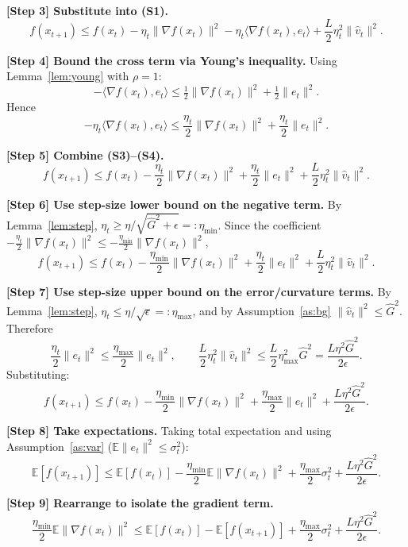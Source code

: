 \documentclass[11pt]{article}
\begin{document}
\noindent\textbf{[Step 3] Substitute into (S1).}
\[
f(x_{t+1}) \le f(x_t) - \eta_t \|\nabla f(x_t)\|^2
- \eta_t \langle \nabla f(x_t), e_t\rangle
+ \frac{L}{2}\eta_t^2 \|\hat v_t\|^2.
\tag{S3}
\]

\noindent\textbf{[Step 4] Bound the cross term via Young's inequality.}
Using Lemma~\ref{lem:young} with $\rho=1$:
\[
-\langle \nabla f(x_t), e_t\rangle
\le \tfrac12 \|\nabla f(x_t)\|^2 + \tfrac12 \|e_t\|^2.
\tag{S4}
\]
Hence
\[
-\eta_t\langle \nabla f(x_t), e_t\rangle
\le \frac{\eta_t}{2}\|\nabla f(x_t)\|^2 + \frac{\eta_t}{2}\|e_t\|^2.
\]

\noindent\textbf{[Step 5] Combine (S3)–(S4).}
\[
f(x_{t+1}) \le f(x_t) - \frac{\eta_t}{2}\|\nabla f(x_t)\|^2
+ \frac{\eta_t}{2}\|e_t\|^2
+ \frac{L}{2}\eta_t^2 \|\hat v_t\|^2.
\tag{S5}
\]

\noindent\textbf{[Step 6] Use step-size lower bound on the negative term.}
By Lemma~\ref{lem:step}, $\eta_t \ge \eta/\sqrt{\hat G^2+\epsilon} =: \eta_{\min}$.
Since the coefficient $-\tfrac{\eta_t}{2}\|\nabla f(x_t)\|^2 \le -\tfrac{\eta_{\min}}{2}\|\nabla f(x_t)\|^2$,
\[
f(x_{t+1}) \le f(x_t) - \frac{\eta_{\min}}{2}\|\nabla f(x_t)\|^2
+ \frac{\eta_t}{2}\|e_t\|^2
+ \frac{L}{2}\eta_t^2 \|\hat v_t\|^2.
\tag{S6}
\]

\noindent\textbf{[Step 7] Use step-size upper bound on the error/curvature terms.}
By Lemma~\ref{lem:step}, $\eta_t \le \eta/\sqrt{\epsilon} =: \eta_{\max}$,
and by Assumption~\ref{as:bg} $\|\hat v_t\|^2 \le \hat G^2$. Therefore
\[
\frac{\eta_t}{2}\|e_t\|^2 \le \frac{\eta_{\max}}{2}\|e_t\|^2,
\qquad
\frac{L}{2}\eta_t^2 \|\hat v_t\|^2 \le \frac{L}{2}\eta_{\max}^2 \hat G^2
= \frac{L\eta^2 \hat G^2}{2\epsilon}.
\tag{S7}
\]
Substituting:
\[
f(x_{t+1}) \le f(x_t) - \frac{\eta_{\min}}{2}\|\nabla f(x_t)\|^2
+ \frac{\eta_{\max}}{2}\|e_t\|^2
+ \frac{L\eta^2 \hat G^2}{2\epsilon}.
\tag{S7'}
\]

\noindent\textbf{[Step 8] Take expectations.}
Taking total expectation and using Assumption~\ref{as:var}
($\mathbb{E}\|e_t\|^2 \le \sigma_t^2$):
\[
\mathbb{E}[f(x_{t+1})] \le \mathbb{E}[f(x_t)]
- \frac{\eta_{\min}}{2}\mathbb{E}\|\nabla f(x_t)\|^2
+ \frac{\eta_{\max}}{2}\sigma_t^2
+ \frac{L\eta^2 \hat G^2}{2\epsilon}.
\tag{S8}
\]

\noindent\textbf{[Step 9] Rearrange to isolate the gradient term.}
\[
\frac{\eta_{\min}}{2}\mathbb{E}\|\nabla f(x_t)\|^2
\le \mathbb{E}[f(x_t)] - \mathbb{E}[f(x_{t+1})]
+ \frac{\eta_{\max}}{2}\sigma_t^2
+ \frac{L\eta^2 \hat G^2}{2\epsilon}.
\tag{S9}
\]
\end{document}
